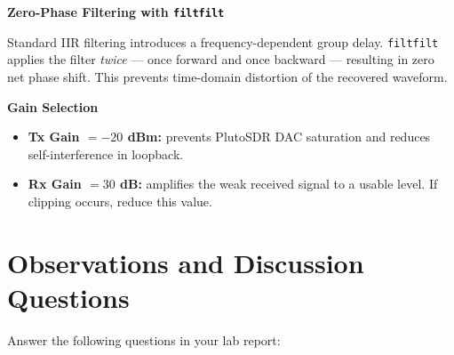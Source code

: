 \documentclass[12pt,a4paper]{article}
\begin{document}
\vspace{8pt}

\begin{mdframed}[linecolor=green!50!black, linewidth=1pt, roundcorner=6pt,
                  backgroundcolor=green!3]
\textbf{Zero-Phase Filtering with \texttt{filtfilt}}

Standard IIR filtering introduces a frequency-dependent group delay.
\texttt{filtfilt} applies the filter \emph{twice} — once forward and once
backward — resulting in zero net phase shift.  This prevents time-domain
distortion of the recovered waveform.
\end{mdframed}

\vspace{8pt}

\begin{mdframed}[linecolor=orange!70!black, linewidth=1pt, roundcorner=6pt,
                  backgroundcolor=orange!3]
\textbf{Gain Selection}

\begin{itemize}
  \item \textbf{Tx Gain $= -20$ dBm:} prevents PlutoSDR DAC saturation and
        reduces self-interference in loopback.
  \item \textbf{Rx Gain $= 30$ dB:} amplifies the weak received signal to a
        usable level.  If clipping occurs, reduce this value.
\end{itemize}
\end{mdframed}

\section{Observations and Discussion Questions}

Answer the following questions in your lab report:
\end{document}
